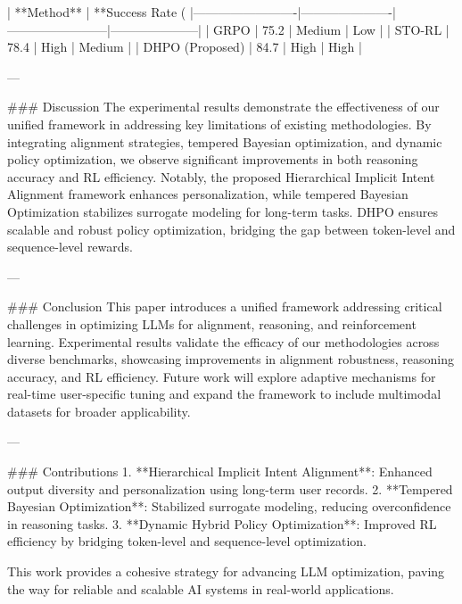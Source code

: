 | **Method**             | **Success Rate (%
|-------------------------|----------------------|------------------------|---------------------|
| GRPO                   | 75.2                | Medium                | Low                 |
| STO-RL                 | 78.4                | High                  | Medium              |
| DHPO (Proposed)        | 84.7                | High                  | High                |

---

### Discussion
The experimental results demonstrate the effectiveness of our unified framework in addressing key limitations of existing methodologies. By integrating alignment strategies, tempered Bayesian optimization, and dynamic policy optimization, we observe significant improvements in both reasoning accuracy and RL efficiency. Notably, the proposed Hierarchical Implicit Intent Alignment framework enhances personalization, while tempered Bayesian Optimization stabilizes surrogate modeling for long-term tasks. DHPO ensures scalable and robust policy optimization, bridging the gap between token-level and sequence-level rewards.

---

### Conclusion
This paper introduces a unified framework addressing critical challenges in optimizing LLMs for alignment, reasoning, and reinforcement learning. Experimental results validate the efficacy of our methodologies across diverse benchmarks, showcasing improvements in alignment robustness, reasoning accuracy, and RL efficiency. Future work will explore adaptive mechanisms for real-time user-specific tuning and expand the framework to include multimodal datasets for broader applicability.

---

### Contributions
1. **Hierarchical Implicit Intent Alignment**: Enhanced output diversity and personalization using long-term user records.
2. **Tempered Bayesian Optimization**: Stabilized surrogate modeling, reducing overconfidence in reasoning tasks.
3. **Dynamic Hybrid Policy Optimization**: Improved RL efficiency by bridging token-level and sequence-level optimization.

This work provides a cohesive strategy for advancing LLM optimization, paving the way for reliable and scalable AI systems in real-world applications.